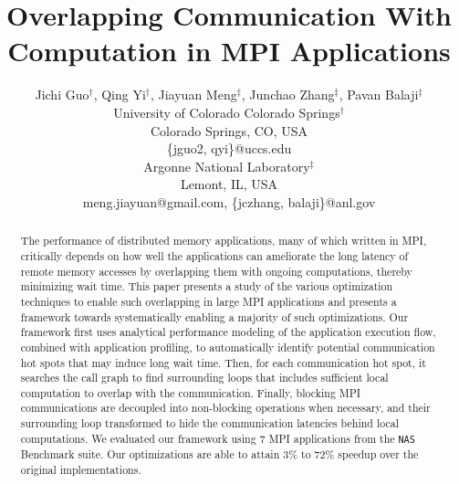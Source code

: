 \documentclass[10pt,doublecolumn,conference]{IEEEtran}
\begin{document}
%
%
\title{Overlapping Communication With Computation in MPI Applications}

\author{Jichi Guo$^\dag$, Qing Yi$^\dag$, Jiayuan Meng$^\ddag$, Junchao Zhang$^\ddag$, Pavan Balaji$^\ddag$\\
University of Colorado Colorado Springs$^\dag$\\
Colorado Springs, CO, USA\\
\{jguo2, qyi\}@uccs.edu \\
Argonne National Laboratory$^\ddag$\\
Lemont, IL, USA\\
meng.jiayuan@gmail.com, \{jczhang, balaji\}@anl.gov
}

\maketitle

\begin{abstract}
The performance of distributed memory applications, many of which written in MPI, critically depends on how well the
applications can ameliorate the long latency of remote memory accesses by overlapping them with ongoing computations,
thereby minimizing wait time.
This paper presents a study of the various optimization techniques to enable such overlapping in large MPI applications
and presents a framework towards systematically  enabling a majority of such optimizations.
Our framework first uses analytical performance modeling of the application execution flow,
 combined with application profiling, to automatically
identify potential communication hot spots that may induce long wait time.
Then, for each communication hot spot,
it searches the call graph to find surrounding loops that includes sufficient local computation
to overlap with the communication.
Finally,  blocking MPI communications are decoupled into non-blocking operations when necessary, and their surrounding loop
transformed to hide the communication latencies behind local computations.
We evaluated our framework using 7 MPI applications from the \texttt{NAS} Benchmark suite.
Our optimizations are able to attain 3\% to 72\% speedup over the original implementations.
\end{abstract}
\end{document}

